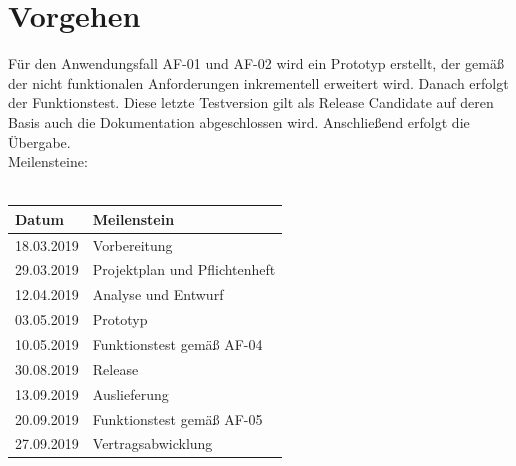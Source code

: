 \documentclass[12pt]{article}
\begin{document}
\section{Vorgehen}
Für den Anwendungsfall AF-01 und AF-02 wird ein Prototyp erstellt, der gemäß der nicht funktionalen Anforderungen inkrementell erweitert wird. Danach erfolgt der Funktionstest. Diese letzte Testversion gilt als Release Candidate auf deren Basis auch die Dokumentation abgeschlossen wird. Anschließend erfolgt die Übergabe.\\
Meilensteine:\\\\
\begin{tabularx}{\textwidth}{|X|X|} \hline
\textbf{Datum}&\textbf{Meilenstein}\\ \hline
18.03.2019&Vorbereitung\\ \hline
29.03.2019&Projektplan und Pflichtenheft\\ \hline
12.04.2019&Analyse und Entwurf\\ \hline
03.05.2019&Prototyp\\ \hline
10.05.2019&Funktionstest gemäß AF-04\\ \hline
30.08.2019&Release\\ \hline
13.09.2019&Auslieferung\\ \hline
20.09.2019&Funktionstest gemäß AF-05\\ \hline
27.09.2019&Vertragsabwicklung\\ \hline
\end{tabularx}\\\\

\newpage

\end{document}
